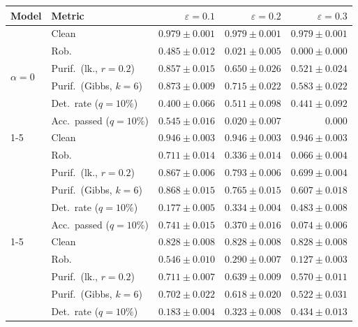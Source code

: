 \begin{table}[htbp]
  \centering
  \small
  \begin{tabular}{@{}llrrr@{}}
    \toprule
    Model & Metric & $\varepsilon=0.1$ & $\varepsilon=0.2$ & $\varepsilon=0.3$ \\
    \midrule
    \multirow{6}{*}{$\alpha{=}0$} & Clean & $\mathbf{0.979 \pm 0.001}$ & $\mathbf{0.979 \pm 0.001}$ & $\mathbf{0.979 \pm 0.001}$ \\
     & Rob. & $0.485 \pm 0.012$ & $0.021 \pm 0.005$ & $0.000 \pm 0.000$ \\
     & Purif.\ (lk., $r{=}0.2$) & $0.857 \pm 0.015$ & $0.650 \pm 0.026$ & $0.521 \pm 0.024$ \\
     & Purif.\ (Gibbs, $k{=}6$) & $0.873 \pm 0.009$ & $0.715 \pm 0.022$ & $0.583 \pm 0.022$ \\
     & Det.\ rate ($q{=}10\%$) & $0.400 \pm 0.066$ & $0.511 \pm 0.098$ & $0.441 \pm 0.092$ \\
     & Acc.\ passed ($q{=}10\%$) & $0.545 \pm 0.016$ & $0.020 \pm 0.007$ & $0.000$ \\
    \cmidrule(lr){1-5}
    \multirow{6}{*}{$\alpha{=}0.01$} & Clean & $0.946 \pm 0.003$ & $0.946 \pm 0.003$ & $0.946 \pm 0.003$ \\
     & Rob. & $0.711 \pm 0.014$ & $0.336 \pm 0.014$ & $0.066 \pm 0.004$ \\
     & Purif.\ (lk., $r{=}0.2$) & $0.867 \pm 0.006$ & $0.793 \pm 0.006$ & $0.699 \pm 0.004$ \\
     & Purif.\ (Gibbs, $k{=}6$) & $0.868 \pm 0.015$ & $0.765 \pm 0.015$ & $0.607 \pm 0.018$ \\
     & Det.\ rate ($q{=}10\%$) & $0.177 \pm 0.005$ & $0.334 \pm 0.004$ & $0.483 \pm 0.008$ \\
     & Acc.\ passed ($q{=}10\%$) & $0.741 \pm 0.015$ & $0.370 \pm 0.016$ & $0.074 \pm 0.006$ \\
    \cmidrule(lr){1-5}
    \multirow{6}{*}{$\alpha{=}0.1$} & Clean & $0.828 \pm 0.008$ & $0.828 \pm 0.008$ & $0.828 \pm 0.008$ \\
     & Rob. & $0.546 \pm 0.010$ & $0.290 \pm 0.007$ & $0.127 \pm 0.003$ \\
     & Purif.\ (lk., $r{=}0.2$) & $0.711 \pm 0.007$ & $0.639 \pm 0.009$ & $0.570 \pm 0.011$ \\
     & Purif.\ (Gibbs, $k{=}6$) & $0.702 \pm 0.022$ & $0.618 \pm 0.020$ & $0.522 \pm 0.031$ \\
     & Det.\ rate ($q{=}10\%$) & $0.183 \pm 0.004$ & $0.323 \pm 0.008$ & $0.434 \pm 0.013$ \\

\end{tabular}
\end{table}
